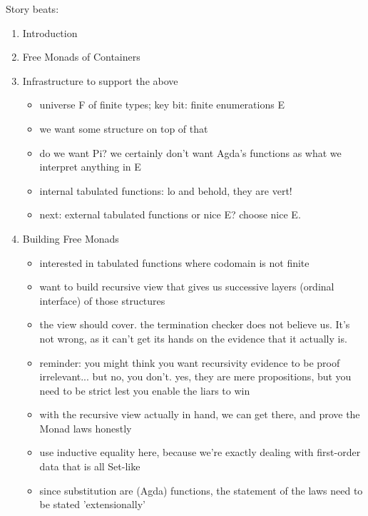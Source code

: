 \documentclass[acmsmall,review,prologue,dvipsnames,bookmarks=false]{acmart}
\begin{document}
Story beats:
\begin{enumerate}
\item Introduction
\item Free Monads of Containers

\item Infrastructure to support the above
\begin{itemize}
\item universe F of finite types; key bit: finite enumerations E
\item we want some structure on top of that
\item do we want Pi? we certainly don't want Agda's functions as what we interpret anything in E
\item internal tabulated functions: lo and behold, they are vert!
\item next: external tabulated functions or nice E? choose nice E.
\end{itemize}

\item Building Free Monads
\begin{itemize}
\item interested in tabulated functions where codomain is not finite
\item want to build recursive view that gives us successive layers (ordinal interface) of those
structures
\item the view should cover. the termination checker does not believe us. It's not wrong, as
it can't get its hands on the evidence that it actually is.
\item reminder: you might think you want recursivity evidence to be proof irrelevant... but no, you don't.
yes, they are mere propositions, but you need to be strict lest you enable the liars to win
\item with the recursive view actually in hand, we can get there, and prove the Monad laws honestly
\item use inductive equality here, because we're exactly dealing with first-order data that is all Set-like
\item since substitution are (Agda) functions, the statement of the laws need to be stated 'extensionally'
\end{itemize}


\end{enumerate}
\end{document}
